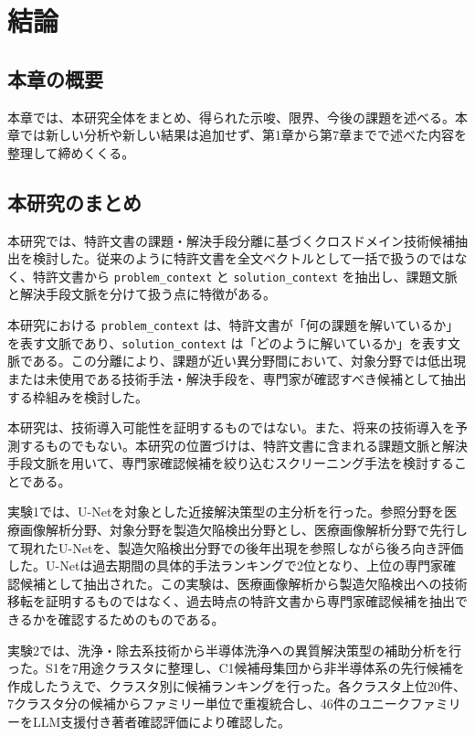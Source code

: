 \chapter{結論}

\section{本章の概要}

本章では、本研究全体をまとめ、得られた示唆、限界、今後の課題を述べる。本章では新しい分析や新しい結果は追加せず、第1章から第7章までで述べた内容を整理して締めくくる。

\section{本研究のまとめ}

本研究では、特許文書の課題・解決手段分離に基づくクロスドメイン技術候補抽出を検討した。従来のように特許文書を全文ベクトルとして一括で扱うのではなく、特許文書から \texttt{problem\_context} と \texttt{solution\_context} を抽出し、課題文脈と解決手段文脈を分けて扱う点に特徴がある。

本研究における \texttt{problem\_context} は、特許文書が「何の課題を解いているか」を表す文脈であり、\texttt{solution\_context} は「どのように解いているか」を表す文脈である。この分離により、課題が近い異分野間において、対象分野では低出現または未使用である技術手法・解決手段を、専門家が確認すべき候補として抽出する枠組みを検討した。

本研究は、技術導入可能性を証明するものではない。また、将来の技術導入を予測するものでもない。本研究の位置づけは、特許文書に含まれる課題文脈と解決手段文脈を用いて、専門家確認候補を絞り込むスクリーニング手法を検討することである。

実験1では、U-Netを対象とした近接解決策型の主分析を行った。参照分野を医療画像解析分野、対象分野を製造欠陥検出分野とし、医療画像解析分野で先行して現れたU-Netを、製造欠陥検出分野での後年出現を参照しながら後ろ向き評価した。U-Netは過去期間の具体的手法ランキングで2位となり、上位の専門家確認候補として抽出された。この実験は、医療画像解析から製造欠陥検出への技術移転を証明するものではなく、過去時点の特許文書から専門家確認候補を抽出できるかを確認するためのものである。

実験2では、洗浄・除去系技術から半導体洗浄への異質解決策型の補助分析を行った。S1を7用途クラスタに整理し、C1候補母集団から非半導体系の先行候補を作成したうえで、クラスタ別に候補ランキングを行った。各クラスタ上位20件、7クラスタ分の候補からファミリー単位で重複統合し、46件のユニークファミリーをLLM支援付き著者確認評価により確認した。

